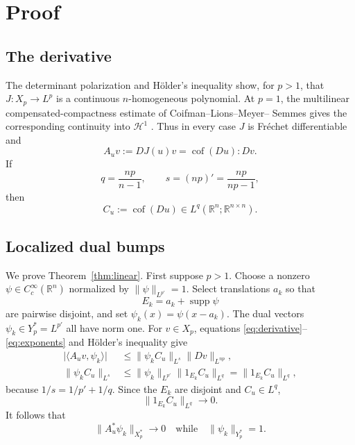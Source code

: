 \documentclass[11pt]{article}
\theoremstyle{remark}
\newcommand{\R}{\mathbb R}
\newcommand{\norm}[1]{\lVert #1\rVert}
\newcommand{\cof}{\operatorname{cof}}
\newcommand{\supp}{\operatorname{supp}}
\begin{document}
\section{Proof}

\subsection{The derivative}

The determinant polarization and H\"older's inequality show, for $p>1$,
that $J:X_p\to L^p$ is a continuous $n$-homogeneous polynomial.  At $p=1$,
the multilinear compensated-compactness estimate of Coifman--Lions--Meyer--
Semmes gives the corresponding continuity into $\mathcal H^1$
\cite{CLMS,Lindberg}.  Thus in every case $J$ is Fr\'echet differentiable and
\begin{equation}\label{eq:derivative}
 A_u v:=DJ(u)v=\cof(Du):Dv.
\end{equation}
If
\begin{equation}\label{eq:exponents}
 q=\frac{np}{n-1},\qquad s=(np)'=\frac{np}{np-1},
\end{equation}
then
\[
 C_u:=\cof(Du)\in L^q(\R^n;\R^{n\times n}).
\]

\subsection{Localized dual bumps}

We prove Theorem~\ref{thm:linear}.  First suppose $p>1$.  Choose a nonzero
$\psi\in C_c^\infty(\R^n)$ normalized by
$\norm{\psi}_{L^{p'}}=1$.  Select translations $a_k$ so that
\[
 E_k=a_k+\supp\psi
\]
are pairwise disjoint, and set $\psi_k(x)=\psi(x-a_k)$.  The dual vectors
$\psi_k\in Y_p^*=L^{p'}$ all have norm one.  For $v\in X_p$, equations
\eqref{eq:derivative}--\eqref{eq:exponents} and H\"older's inequality give
\begin{align}
 \big|\langle A_uv,\psi_k\rangle\big|
 &\leq \norm{\psi_k C_u}_{L^s}\norm{Dv}_{L^{np}},\label{eq:dual}\\
 \norm{\psi_k C_u}_{L^s}
 &\leq \norm{\psi_k}_{L^{p'}}
          \norm{1_{E_k}C_u}_{L^q}
  =\norm{1_{E_k}C_u}_{L^q},\label{eq:holder}
\end{align}
because $1/s=1/p'+1/q$.  Since the $E_k$ are disjoint and $C_u\in L^q$,
\begin{equation}\label{eq:vanish}
 \norm{1_{E_k}C_u}_{L^q}\longrightarrow0.
\end{equation}
It follows that
\[
 \norm{A_u^*\psi_k}_{X_p^*}\longrightarrow0
 \quad\text{while}\quad
 \norm{\psi_k}_{Y_p^*}=1.
\]
\end{document}
